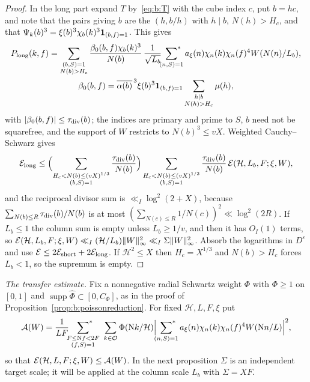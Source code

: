 \begin{proof}
In the long part expand $T$ by~\eqref{eq:b:T} with the cube index $c$, put $b=hc$, and note that the pairs giving $b$ are the $(h,b/h)$ with $h\mid b$, $N(h)>H_c$, and that $\Psi_k(b)^3=\xi(b)^3\chi_b(k)^3\mathbf{1}_{(b,f)=1}$. This gives
\[
  \begin{gathered}
  P_{\rm long}(k,f)=\sum_{\substack{(b,S)=1\\N(b)>H_c}}\frac{\beta_0(b,f)\chi_b(k)^3}{N(b)}\,\frac1{\sqrt{L_b}}\sideset{}{^*}\sum_{(n,S)=1}a_\xi(n)\chi_n(k)\chi_n(f)^4W(N(n)/L_b),\\
  \beta_0(b,f)=\overline{\alpha(b)}^{\,3}\xi(b)^3\mathbf{1}_{(b,f)=1}\sum_{\substack{h\mid b\\N(h)>H_c}}\mu(h),
  \end{gathered}
\]
with $|\beta_0(b,f)|\le\tau_{\rm div}(b)$; the indices are primary and prime to $S$, $b$ need not be squarefree, and the support of $W$ restricts to $N(b)^3\le vX$. Weighted Cauchy--Schwarz gives
\[
  \mathcal{E}_{\rm long}\le\Bigl(\sum_{\substack{H_c<N(b)\le(vX)^{1/3}\\(b,S)=1}}\frac{\tau_{\rm div}(b)}{N(b)}\Bigr)\sum_{\substack{H_c<N(b)\le(vX)^{1/3}\\(b,S)=1}}\frac{\tau_{\rm div}(b)}{N(b)}\,\mathcal{E}(\mathcal H,L_b,F;\xi,W),
\]
and the reciprocal divisor sum is $\ll_I\log^2(2+X)$, because $\sum_{N(b)\le R}\tau_{\rm div}(b)/N(b)$ is at most $(\sum_{N(c)\le R}1/N(c))^2\ll\log^2(2R)$. If $L_b\le1$ the column sum is empty unless $L_b\ge1/v$, and then it has $O_I(1)$ terms, so $\mathcal{E}(\mathcal H,L_b,F;\xi,W)\ll_I(\mathcal H/L_b)\|W\|_\infty^2\ll_I\Sigma\|W\|_\infty^2$. Absorb the logarithms in $D^\varepsilon$ and use $\mathcal{E}\le2\mathcal{E}_{\rm short}+2\mathcal{E}_{\rm long}$. If $\mathcal H^2\le X$ then $H_c=X^{1/3}$ and $N(b)>H_c$ forces $L_b<1$, so the supremum is empty.
\end{proof}

\emph{The transfer estimate.} Fix a nonnegative radial Schwartz weight $\Phi$ with $\Phi\ge1$ on $[0,1]$ and $\operatorname{supp}\widehat\Phi\subset[0,C_\Phi]$, as in the proof of Proposition~\ref{prop:b:poissonreduction}. For fixed $\mathcal H,L,F,\xi$ put
\begin{equation}\label{eq:b:smoothedenergy}
  \mathcal A(W)=\frac1{LF}\sfstar_{\substack{F\le\NK f<2F\\(f,S)=1}}\ \sum_{k\in\OO}\Phi(\NK k/\mathcal H)\Bigl|\sfstar_{(n,S)=1}a_\xi(n)\chi_n(k)\chi_n(f)^4W(\NK n/L)\Bigr|^2,
\end{equation}
so that $\mathcal{E}(\mathcal H,L,F;\xi,W)\le\mathcal A(W)$. In the next proposition $\Sigma$ is an independent target scale; it will be applied at the column scale $L_b$ with $\Sigma=XF$.

